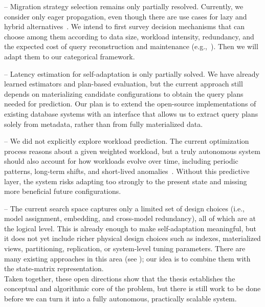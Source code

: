  -- Migration strategy selection remains only partially resolved. Currently, we consider only eager propagation, even though there are use cases for lazy and hybrid alternatives~\citep{scherzinger2013managing, scherzinger2016nosql}. We intend to first survey decision mechanisms that can choose among them according to data size, workload intensity, redundancy, and the expected cost of query reconstruction and maintenance (e.g.,~\citep{hillenbrand2019migcast, DBLP:conf/icde/HillenbrandSLNK20}). Then we will adapt them to our categorical framework.

 -- Latency estimation for self-adaptation is only partially solved. We have already learned estimators and plan-based evaluation, but the current approach still depends on materializing candidate configurations to obtain the query plans needed for prediction. Our plan is to extend the open-source implementations of existing database systems with an interface that allows us to extract query plans solely from metadata, rather than from fully materialized data.

 -- We did not explicitly explore workload prediction. The current optimization process reasons about a given weighted workload, but a truly autonomous system should also account for how workloads evolve over time, including periodic patterns, long-term shifts, and short-lived anomalies~\citep{DBLP:conf/sigmod/MaAHMPG18}. Without this predictive layer, the system risks adapting too strongly to the present state and missing more beneficial future configurations.

 -- The current search space captures only a limited set of design choices (i.e., model assignment, embedding, and cross-model redundancy), all of which are at the logical level. This is already enough to make self-adaptation meaningful, but it does not yet include richer physical design choices such as indexes, materialized views, partitioning, replication, or system-level tuning parameters. There are many existing approaches in this area (see ); our idea is to combine them with the state-matrix representation.\\

\noindent Taken together, these open directions show that the thesis establishes the conceptual and algorithmic core of the problem, but there is still work to be done before we can turn it into a fully autonomous, practically scalable system.
